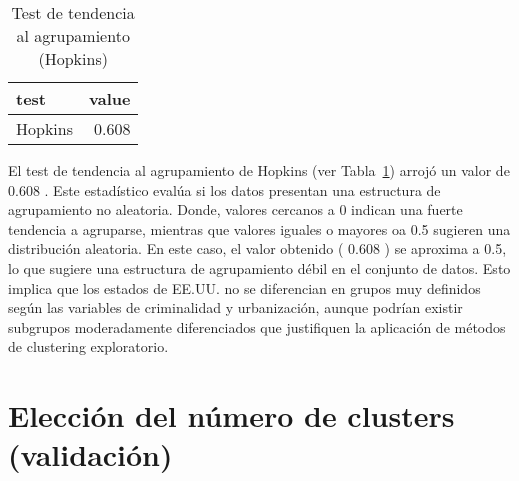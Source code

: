 \documentclass[
  spanish,
  11pt,
  a4paper,
  DIV=11,
  numbers=noendperiod]{scrartcl}
\begin{document}
\begin{longtable}[]{@{}lr@{}}

\caption{\label{tbl-clust-hopkins}Test de tendencia al agrupamiento
(Hopkins)}

\tabularnewline

\toprule\noalign{}
test & value \\
\midrule\noalign{}
\endhead
\bottomrule\noalign{}
\endlastfoot
Hopkins & 0.608 \\

\end{longtable}

El test de tendencia al agrupamiento de Hopkins (ver
Tabla~\ref{tbl-clust-hopkins}) arrojó un valor de 0.608 . Este
estadístico evalúa si los datos presentan una estructura de agrupamiento
no aleatoria. Donde, valores cercanos a 0 indican una fuerte tendencia a
agruparse, mientras que valores iguales o mayores oa 0.5 sugieren una
distribución aleatoria. En este caso, el valor obtenido ( 0.608 ) se
aproxima a 0.5, lo que sugiere una estructura de agrupamiento débil en
el conjunto de datos. Esto implica que los estados de EE.UU. no se
diferencian en grupos muy definidos según las variables de criminalidad
y urbanización, aunque podrían existir subgrupos moderadamente
diferenciados que justifiquen la aplicación de métodos de clustering
exploratorio.

\section{Elección del número de clusters
(validación)}\label{elecciuxf3n-del-nuxfamero-de-clusters-validaciuxf3n}
\end{document}
